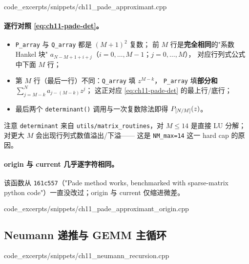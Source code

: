 
  {code_excerpts/snippets/ch11_pade_approximant.cpp}

\paragraph{逐行对照 \cref{eq:ch11-pade-det}。}
\begin{itemize}
  \item \texttt{P\_array} 与 \texttt{Q\_array} 都是 \((M+1)^2\) 复数；
        前 \(M\) 行是\textbf{完全相同}的"系数 Hankel 块"
        \(a_{N-M+1+i+j}\)（\(i = 0,\ldots,M-1\)；\(j = 0,\ldots,M\)），
        对应行列式公式中下面 \(M\) 行；
  \item 第 \(M\) 行（最后一行）不同：\texttt{Q\_array} 填 \(z^{M-k}\)，
        \texttt{P\_array} 填\textbf{部分和} \(\sum_{j=M-k}^{N} a_{j-(M-k)} z^j\)；
        这正对应 \cref{eq:ch11-pade-det} 的最上行/底行；
  \item 最后两个 \texttt{determinant()} 调用与一次复数除法即得 \(P_{[N/M]}(z)\)。
\end{itemize}
注意 \texttt{determinant} 来自 \texttt{utils/matrix\_routines}，对 \(M\le 14\)
是直接 LU 分解；对更大 \(M\) 会出现行列式数值溢出/下溢——
这是 \texttt{NM\_max=14} 这一 hard cap 的原因。

\paragraph{origin 与 current 几乎逐字符相同。}
该函数从 \texttt{161c557}（"Pade method works, benchmarked with sparse-matrix
python code"）一直没改过；origin 与 current 仅缩进微差。


  {code_excerpts/snippets/ch11_pade_approximant_origin.cpp}

\subsection{Neumann 递推与 GEMM 主循环}
\label{subsec:ch11-neumann-recursion}


  {code_excerpts/snippets/ch11_neumann_recursion.cpp}

